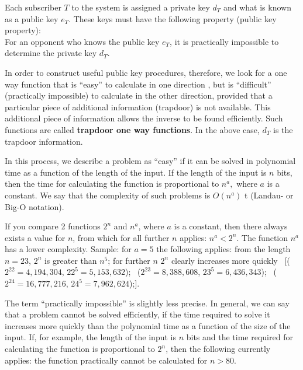 Each subscriber $ T $ to the system is assigned a private  
 key $ d_T $   and what is known as a public key $ e_T $. 
These keys must have the following property (public key property):\\
For an opponent who knows the public key $ e_T $, it is practically impossible 
to determine the private key  $ d_T $.\par

In order to construct useful public key procedures, therefore, we look for a 
one way function that is ``easy'' to calculate in one direction {}, but 
is ``difficult'' (practically impossible) to calculate in the other 
direction, provided that a particular piece of additional information 
 (trapdoor) is not available. This 
additional piece of information allows the inverse to be found efficiently. Such 
functions are called {\bf trapdoor one way functions}. In the above case, $ d_T 
$ is the trapdoor information. \par

In this process, we describe a problem as ``easy'' if it can be solved in 
 polynomial time as a function of the length of the 
input. If the length of the input is $ n $ bits, then the time for calculating 
the function is proportional to $ n^{a}, $ where $ a $  is a constant. We say 
that the  complexity of such problems is $ O(n^{a}) $
t (Landau- or Big-O notation). 

If you compare 2 functions  $ 2^n $  and   $ n^{a} $,  where $ a $  is a
constant, then there always exists a value for  $ n $,  from which for all
further  $ n $  applies: $ n^{a}  <  2^n $. 
The function  $ n^{a} $  has a lower complexity.    
Sample: for $ a=5 $ the following applies: from the length $ n=23 $, $ 2^n$
is greater than $n^5 $; for further $ n $  $ 2^n $ clearly increases more
quickly \
[($ 2^{22}= 4,194,304 $, $ 22^5= 5,153,632 $); \
 ($ 2^{23}= 8,388,608 $, $ 23^5= 6,436,343 $); \
 ($ 2^{24}=16,777,216 $, $ 24^5= 7,962,624 $);].\par 

The term ``practically impossible'' is slightly less precise. In 
general, we can say that a problem cannot be solved  
efficiently, if the time required to solve it increases more quickly than the 
polynomial time as a function of the size of the input. If, for example, the 
length of the input is $ n $  bits and the time required for calculating the 
function is proportional to $ 2^n $, then the following currently applies: the 
function practically cannot be calculated for $n > 80$.

